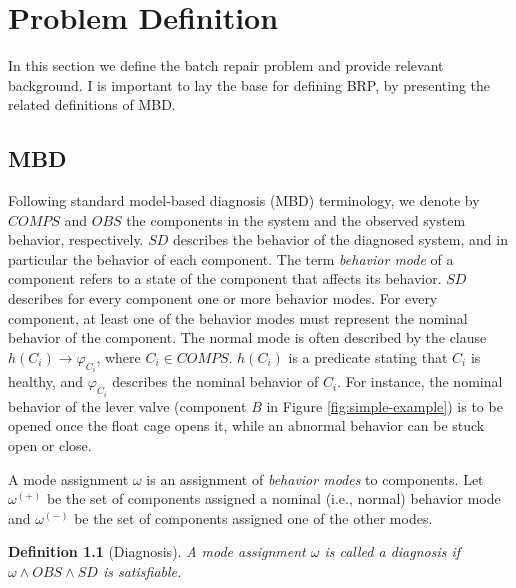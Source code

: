 \documentclass[a4paper,11pt]{report}
\newcommand\hilla[1]{\textcolor{blue}{hilla: #1}}
\newcommand\roni[1]{\textcolor{green}{roni: #1}}
\newtheorem{definition}{Definition}
\newcommand{\COMPS}{\textit{COMPS}}
\newcommand{\SD}{\textit{SD}}
\newcommand{\OBS}{\textit{OBS}}
\begin{document}
\chapter{Problem Definition}


In this section we define the batch repair problem and provide relevant background. 
I is important to lay the base for defining BRP, by presenting the related definitions of MBD. 

\section{MBD}
Following standard model-based diagnosis (MBD) terminology, we denote by $\COMPS$ and $\OBS$ the components in the system and the observed system behavior, respectively. $\SD$ describes the behavior of the diagnosed system, and in particular the behavior of each component. The term {\em behavior mode} of a component refers to a state of the component that affects its behavior. $\SD$ describes for every component one or more behavior modes. For every component, at least one of the behavior modes must represent the nominal behavior of the component. The normal mode is often described by the clause $h(C_i) \rightarrow \varphi_{C_i}$, where $C_i\in \COMPS$. $h(C_i)$ is a predicate stating that $C_i$ is healthy, and $\varphi_{C_i}$ describes the nominal behavior of $C_i$. For instance, the nominal behavior of the lever valve (component $B$ in Figure \ref{fig:simple-example}) is to be opened once the float cage opens it, while an abnormal behavior can be stuck open or close.

A mode assignment $\omega$ is an assignment of {\em behavior modes} to components. Let $\omega^{(+)}$ be the set of components assigned a nominal (i.e., normal) behavior mode and $\omega^{(-)}$ be the set of components assigned one of the other modes.

\begin{definition}[Diagnosis]
A mode assignment $\omega$ is called a diagnosis if $\omega \wedge \OBS \wedge \SD$ is satisfiable.
\end{definition}
\end{document}
